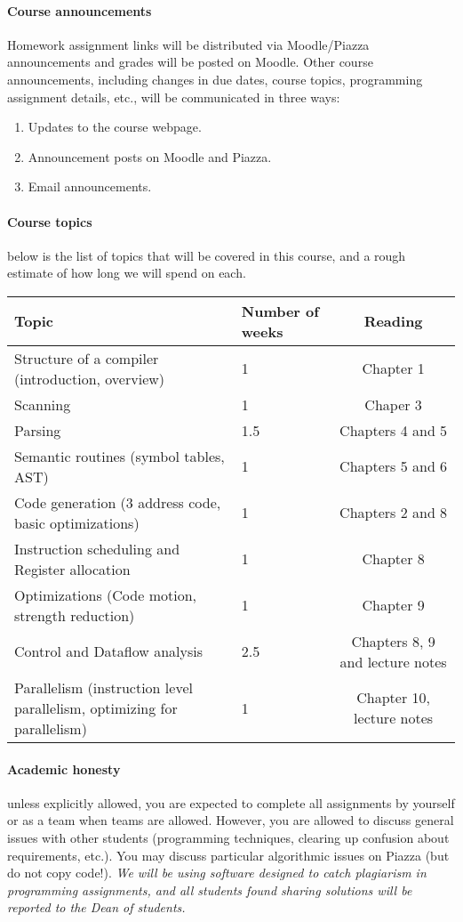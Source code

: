 \documentclass{article}
\begin{document}
\paragraph{Course announcements} Homework assignment links will be distributed via Moodle/Piazza announcements and grades will be posted on Moodle. Other course announcements, including changes in due dates, course topics, programming assignment details, etc., will be communicated in three ways:
\begin{enumerate}
\item Updates to the course webpage.
\item Announcement posts on Moodle and Piazza.
\item Email announcements.
\end{enumerate}

\paragraph{Course topics} below is the list of topics that will be covered in this course, and a rough estimate of how long we will spend on each. 
\begin{table}[H]
\centering
	\begin{tabulary}{\linewidth}{|p{90mm}|p{15mm}|c|} \hline
		Topic & Number of weeks & Reading \\ \hline
		Structure of a compiler (introduction, overview) & 1 & Chapter 1\\ \hline
		Scanning & 1 & Chaper 3 \\ \hline
		Parsing & 1.5 & Chapters 4 and 5 \\ \hline
		Semantic routines (symbol tables, AST)  & 1 & Chapters 5 and 6\\ \hline
		Code generation (3 address code, basic optimizations) & 1 & Chapters 2 and 8 \\ \hline
		Instruction scheduling and Register allocation & 1 & Chapter 8 \\ \hline
		Optimizations (Code motion, strength reduction) & 1 & Chapter 9 \\ \hline
		Control and Dataflow analysis & 2.5 & Chapters 8, 9 and lecture notes \\ \hline
		Parallelism (instruction level parallelism, optimizing for parallelism) & 1 & Chapter 10, lecture notes  \\ \hline
\end{tabulary}
\end{table}


\paragraph{Academic honesty} unless explicitly allowed, you are expected to complete all
assignments by yourself or as a team when teams are allowed. 
However, you are allowed to discuss general issues with other
students (programming techniques, clearing up confusion about requirements, etc.).
You may discuss particular algorithmic issues on Piazza (but do not copy code!). {\em We will
be using software designed to catch plagiarism in programming assignments, and all
students found sharing solutions will be reported to the Dean of students.}
\end{document}
